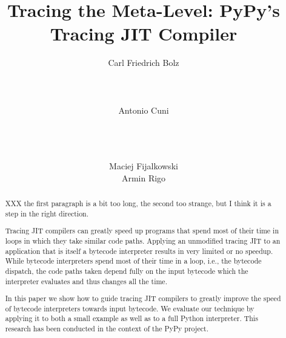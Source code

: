 \documentclass{sig-alternate}
\newcommand\ie{i.e.,\xspace}
\begin{document}
\title{Tracing the Meta-Level: PyPy's Tracing JIT Compiler}

\author{
\alignauthor Carl Friedrich Bolz\\
       \\
       \\
       \\
\alignauthor Antonio Cuni\\
       \\
       \\
       \\
\and
\alignauthor Maciej Fijalkowski\\
\alignauthor Armin Rigo\\
}
\maketitle



\begin{abstract}
XXX the first paragraph is a bit too long, the second too strange, but I think
it is a step in the right direction.

Tracing JIT compilers can greatly speed up programs that spend most of their time
in loops in which they take similar code paths.  Applying an unmodified tracing
JIT to an application that is itself a bytecode interpreter results in very
limited or no speedup. While bytecode interpreters spend most of their time in a
loop, \ie the bytecode dispatch, the code paths taken depend fully on the input
bytecode which the interpreter evaluates and thus changes all the time.

In this paper we show how to guide tracing JIT compilers to greatly improve
the speed of bytecode interpreters towards input bytecode. We evaluate our
technique by applying it to both a small example as well as to a full Python 
interpreter. This research has been conducted in the context of the PyPy 
project.

\end{abstract}
\end{document}
